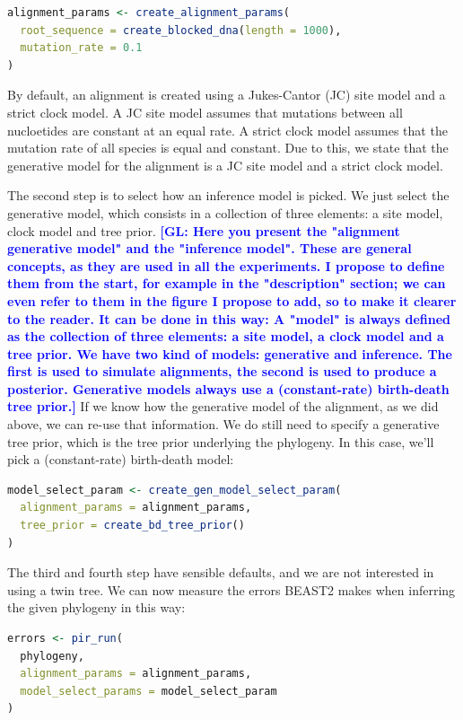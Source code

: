 \documentclass{article}
\newcommand{\giovanni}[1]{\textcolor{blue}{\textbf{[GL: #1]}}}
\begin{document}
\begin{lstlisting}[language=R, floatplacement=H, frame=single]
alignment_params <- create_alignment_params(
  root_sequence = create_blocked_dna(length = 1000),
  mutation_rate = 0.1
)
\end{lstlisting}

By default, an alignment is created using a Jukes-Cantor (JC) site model
and a strict clock model. A JC site model assumes that mutations
between all nucloetides are constant at an equal rate. 
A strict clock model assumes that
the mutation rate of all species is equal and constant.
Due to this, we state that the generative model for the alignment is
a JC site model and a strict clock model.

The second step is to select how an inference model is picked.
We just select the generative model, which consists in a collection of 
three elements: a site model, clock model and tree prior. \giovanni{Here you present the "alignment generative model" and the "inference model". These are general concepts, as they are used in all the experiments. I propose to define them from the start, for example in the "description" section; we can even refer to them in the figure I propose to add, so to make it clearer to the reader. It can be done in this way:
A "model" is always defined as the collection of three elements: a site model, a clock model and a tree prior. We have two kind of models: generative and inference. The first is used to simulate alignments, the second is used to produce a posterior. Generative models always use a (constant-rate) birth-death tree prior.}
If we know how the generative model of the alignment, as we did above,
we can re-use that information. We do still need to specify 
a generative tree prior, which is the tree prior underlying the phylogeny.
In this case, we'll pick a (constant-rate) birth-death model:

\begin{lstlisting}[language=R, floatplacement=H, frame=single]
model_select_param <- create_gen_model_select_param(
  alignment_params = alignment_params,
  tree_prior = create_bd_tree_prior()
)
\end{lstlisting}

The third and fourth step have sensible defaults, and we are not
interested in using a twin tree. We can now measure the errors BEAST2
makes when inferring the given phylogeny in this way:

\begin{lstlisting}[language=R, floatplacement=H, frame=single]
errors <- pir_run(
  phylogeny,
  alignment_params = alignment_params,
  model_select_params = model_select_param
)
\end{lstlisting}
\end{document}
